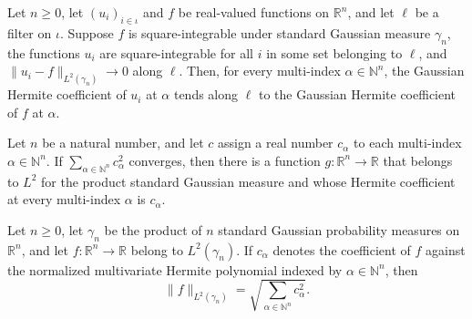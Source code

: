 \begin{lemma}
\label{BooleanAnalysis.GaussianSpace.tendsto_hermiteCoeff_of_eLpNorm_sub_tendsto}
\leanok
{}
Let $n\ge0$, let $(u_i)_{i\in\iota}$ and $f$ be real-valued functions on $\mathbb R^n$,
and let $\ell$ be a filter on $\iota$. Suppose $f$ is square-integrable under standard
Gaussian measure $\gamma_n$, the functions $u_i$ are square-integrable for all $i$ in
some set belonging to $\ell$, and $\|u_i-f\|_{L^2(\gamma_n)}\to0$ along $\ell$. Then,
for every multi-index $\alpha\in\mathbb N^n$, the Gaussian Hermite coefficient of $u_i$
at $\alpha$ tends along $\ell$ to the Gaussian Hermite coefficient of $f$ at $\alpha$.
\end{lemma}

\begin{lemma}
\label{BooleanAnalysis.GaussianSpace.exists_memLp_hermiteCoeff}
\leanok
{}
Let $n$ be a natural number, and let $c$ assign a real number $c_\alpha$ to each
multi-index $\alpha\in\mathbb N^n$. If $\sum_{\alpha\in\mathbb N^n} c_\alpha^2$
converges, then there is a function $g\colon\mathbb R^n\to\mathbb R$ that belongs to
$L^2$ for the product standard Gaussian measure and whose Hermite coefficient at every
multi-index $\alpha$ is $c_\alpha$.
\end{lemma}

\begin{lemma}
\label{BooleanAnalysis.GaussianSpace.eLpNorm_two_eq_sqrt_hermiteCoeff}
\leanok
{}
Let $n\ge0$, let $\gamma_n$ be the product of $n$ standard Gaussian probability measures
on $\mathbb R^n$, and let $f:\mathbb R^n\to\mathbb R$ belong to $L^2(\gamma_n)$. If
$c_\alpha$ denotes the coefficient of $f$ against the normalized multivariate Hermite
polynomial indexed by $\alpha\in\mathbb N^n$, then
\[\|f\|_{L^2(\gamma_n)}=\sqrt{\sum_{\alpha\in\mathbb N^n}c_\alpha^2}.\]
\end{lemma}
